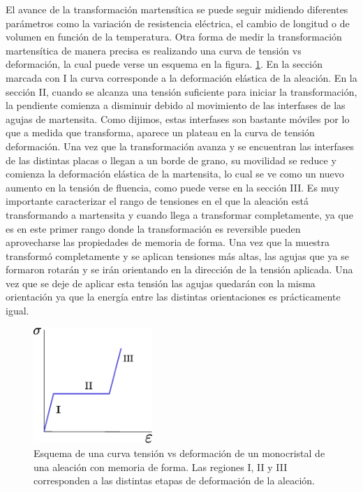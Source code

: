 \documentclass[a4paper,12pt,fleqn,twoside,openany]{book}
\begin{document}






El avance de la transformación martensítica se puede seguir midiendo diferentes parámetros como la variación de resistencia eléctrica, 
el cambio de longitud o de volumen en función de la temperatura. Otra forma de medir la transformación martensítica de manera precisa es realizando 
una curva de tensión vs deformación, la cual puede verse un esquema en la figura. \ref{fig:TensDefSMAMono}. En la sección marcada con I la curva 
corresponde a la deformación elástica de la aleación. En la sección II, cuando se alcanza una tensión 
suficiente para iniciar la transformación, la pendiente comienza a disminuir debido al movimiento de las interfases de las agujas de martensita. 
Como dijimos, estas interfases son bastante móviles por lo que a medida que transforma, aparece un plateau en la curva de tensión deformación. 
Una vez que la transformación avanza y se encuentran las interfases de las distintas placas o llegan a un borde de grano, su movilidad se reduce y 
comienza la deformación elástica de la martensita, lo cual se ve como un nuevo aumento en la tensión de fluencia, como puede verse en la sección III. 
 Es muy importante caracterizar el rango de tensiones en el que la aleación está transformando a martensita y cuando llega a transformar completamente, ya que es en este primer rango donde la transformación es reversible pueden aprovecharse las propiedades de memoria de forma. Una vez que la muestra transformó completamente y se aplican tensiones más altas, las agujas que ya se formaron rotarán y se irán orientando en la dirección de la tensión aplicada. Una vez que se deje de aplicar esta tensión las agujas quedarán con la misma orientación ya que la energía entre las distintas orientaciones es prácticamente igual. 
 


\begin{figure}[h]
 \centering
 \includegraphics[width=0.4\textwidth]{Img/Introduccion/SigmavsDef.eps}
 \caption{Esquema de una curva tensión vs deformación de un monocristal de una aleación con memoria de forma. Las regiones I, II y III corresponden a las distintas etapas de deformación de la aleación.}
 \label{fig:TensDefSMAMono}
 \end{figure}
\end{document}
